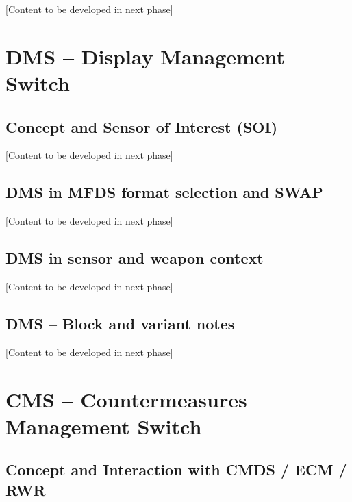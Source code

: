 \documentclass[11pt,a4paper]{article}
\begin{document}
[Content to be developed in next phase]


\section{DMS -- Display Management Switch}

\subsection{Concept and Sensor of Interest (SOI)}

[Content to be developed in next phase]

\subsection{DMS in MFDS format selection and SWAP}

[Content to be developed in next phase]

\subsection{DMS in sensor and weapon context}

[Content to be developed in next phase]

\subsection{DMS -- Block and variant notes}

[Content to be developed in next phase]


\section{CMS -- Countermeasures Management Switch}

\subsection{Concept and Interaction with CMDS / ECM / RWR}
\end{document}
